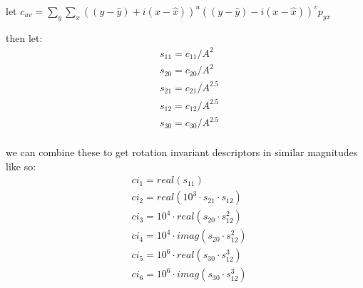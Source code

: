 \documentclass{article}
\begin{document}
{    let $c_{uv} = \sum_{y}\sum_{x}((y - \hat{y}) + i(x - \hat{x}))^{u} ((y - \hat{y}) - i(x - \hat{x}))^{v}p_{yx}$
    
    then let:
    \begin{equation}
        \begin{aligned}
            &s_{11} = c_{11}/A^{2} \\
            &s_{20} = c_{20}/A^{2} \\
            &s_{21} = c_{21}/A^{2.5} \\
            &s_{12} = c_{12}/A^{2.5} \\
            &s_{30} = c_{30}/A^{2.5} \\
        \end{aligned}
    \end{equation}

    we can combine these to get rotation invariant descriptors in similar magnitudes like so:
    \begin{equation}
        \begin{aligned}
            &ci_{1} = \textit{real}(s_{11}) \\
            &ci_{2} = \textit{real}(10^{3}\cdot s_{21} \cdot s_{12}) \\
            &ci_{3} = 10^{4} \cdot \textit{real}(s_{20} \cdot s_{12}^{2})\\
            &ci_{4} = 10^{4} \cdot \textit{imag}(s_{20} \cdot s_{12}^{2})\\
            &ci_{5} = 10^{6} \cdot \textit{real}(s_{30} \cdot s_{12}^{3})\\
            &ci_{6} = 10^{6} \cdot \textit{imag}(s_{30} \cdot s_{12}^{3})\\
        \end{aligned}
    \end{equation}

    }
\end{document}
